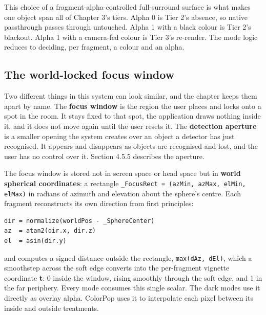 This choice of a fragment-alpha-controlled full-surround surface is what makes one object span all of
Chapter 3's tiers. Alpha 0 is Tier 2's absence, so native passthrough passes through untouched. Alpha
1 with a black colour is Tier 2's blackout. Alpha 1 with a camera-fed colour is Tier 3's re-render.
The mode logic reduces to deciding, per fragment, a colour and an alpha.

\subsection{The world-locked focus window}

Two different things in this system can look similar, and the chapter keeps them apart by name. The
\textbf{focus window} is the region the user places and locks onto a spot in the room. It stays fixed
to that spot, the application draws nothing inside it, and it does not move again until the user
resets it. The \textbf{detection aperture} is a smaller opening the system creates over an object a
detector has just recognised. It appears and disappears as objects are recognised and lost, and the
user has no control over it. Section 4.5.5 describes the aperture.

The focus window is stored not in screen space or head space but in \textbf{world spherical
coordinates}: a rectangle \verb|_FocusRect = (azMin, azMax, elMin, elMax)| in radians of azimuth and
elevation about the sphere's centre. Each fragment reconstructs its own direction from first
principles:

\begin{verbatim}
dir = normalize(worldPos - _SphereCenter)
az  = atan2(dir.x, dir.z)
el  = asin(dir.y)
\end{verbatim}

and computes a signed distance outside the rectangle, \verb|max(dAz, dEl)|, which a smoothstep
across the soft edge converts into the per-fragment vignette coordinate \textbf{t}: 0 inside the
window, rising smoothly through the soft edge, and 1 in the far periphery. Every mode
consumes this single scalar. The dark modes use it directly as overlay alpha. ColorPop uses it to
interpolate each pixel between its inside and outside treatments.

